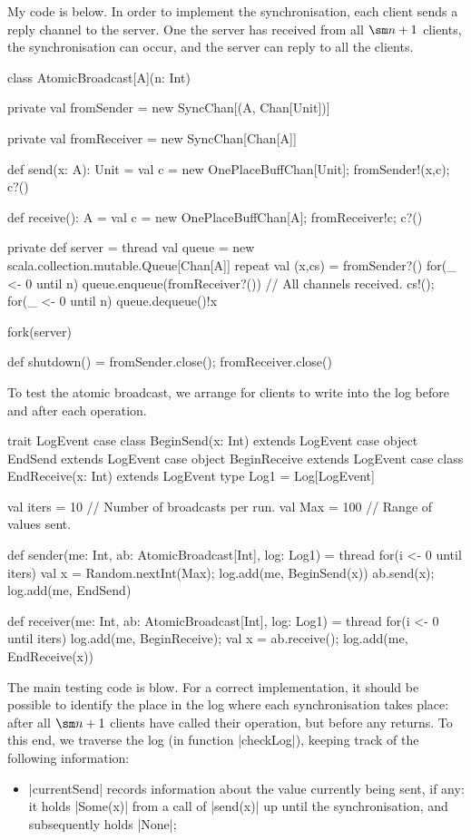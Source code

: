 \begin{answerS}
My code is below.  In order to implement the synchronisation, each client
sends a reply channel to the server.  One the server has received from all
$\sm n+1$ clients, the synchronisation can occur, and the server can reply to
all the clients.
%
\begin{scala}
class AtomicBroadcast[A](n: Int){
  private val fromSender = new SyncChan[(A, Chan[Unit])]

  private val fromReceiver = new SyncChan[Chan[A]]

  def send(x: A): Unit = {
    val c = new OnePlaceBuffChan[Unit]; fromSender!(x,c); c?()
  }

  def receive(): A = {
    val c = new OnePlaceBuffChan[A]; fromReceiver!c; c?()
  }

  private def server = thread{
    val queue = new scala.collection.mutable.Queue[Chan[A]]
    repeat{
      val (x,cs) = fromSender?()
      for(_ <- 0 until n) queue.enqueue(fromReceiver?())
      // All channels received.
      cs!(); for(_ <- 0 until n) queue.dequeue()!x
    }
  }

  fork(server)

  def shutdown() = { fromSender.close(); fromReceiver.close() }
}
\end{scala}

To test the atomic broadcast, we arrange for clients to write into the log
before and after each operation.  

\begin{scala}
  trait LogEvent
  case class BeginSend(x: Int) extends LogEvent
  case object EndSend extends LogEvent
  case object BeginReceive extends LogEvent
  case class EndReceive(x: Int) extends LogEvent
  type Log1 = Log[LogEvent] 

  val iters = 10 // Number of broadcasts per run.
  val Max = 100 // Range of values sent.

  def sender(me: Int, ab: AtomicBroadcast[Int], log: Log1) = thread{
    for(i <- 0 until iters){
      val x = Random.nextInt(Max); log.add(me, BeginSend(x))
      ab.send(x); log.add(me, EndSend)
    }
  }

  def receiver(me: Int, ab: AtomicBroadcast[Int], log: Log1) = thread{
    for(i <- 0 until iters){
      log.add(me, BeginReceive); val x = ab.receive(); log.add(me, EndReceive(x))
    }
  }
\end{scala}

The main testing code is blow.  For a correct implementation, it should be
possible to identify the place in the log where each synchronisation takes
place: after all $\sm n+1$ clients have called their operation, but before any
returns.  To this end, we traverse the log (in function |checkLog|), keeping
track of the following information:
%
\begin{itemize}
\item |currentSend| records information about the value currently being sent,
  if any: it holds |Some(x)| from a call of |send(x)| up until the
  synchronisation, and subsequently holds |None|;


\end{itemize}
\end{answerS}
